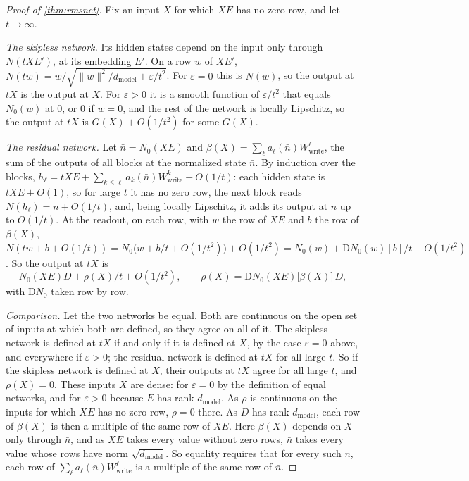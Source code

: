 \documentclass[10pt]{article}
\theoremstyle{definition}
\theoremstyle{remark}
\newcommand{\Wwrite}{W_{\mathrm{write}}}
\newcommand{\dm}{d_{\mathrm{model}}}
\newcommand{\Der}{\mathrm{D}}
\newcommand{\norm}[1]{\lVert #1\rVert}
\begin{document}
\begin{proof}[Proof of \cref{thm:rmsnet}]
Fix an input $X$ for which $XE$ has no zero row, and let $t \to \infty$.

\emph{The skipless network.} Its hidden states depend on the input only through $N(tXE')$, at its embedding $E'$. On a row $w$ of $XE'$, $N(tw) = w/\sqrt{\norm{w}^2/\dm + \varepsilon/t^2}$. For $\varepsilon = 0$ this is $N(w)$, so the output at $tX$ is the output at $X$. For $\varepsilon > 0$ it is a smooth function of $\varepsilon/t^2$ that equals $N_0(w)$ at $0$, or $0$ if $w = 0$, and the rest of the network is locally Lipschitz, so the output at $tX$ is $G(X) + O(1/t^2)$ for some $G(X)$.

\emph{The residual network.} Let $\bar n = N_0(XE)$ and $\beta(X) = \sum_\ell a_\ell(\bar n)\Wwrite^{\ell}$, the sum of the outputs of all blocks at the normalized state $\bar n$. By induction over the blocks, $h_\ell = tXE + \sum_{k \le \ell} a_k(\bar n)\Wwrite^{k} + O(1/t)$: each hidden state is $tXE + O(1)$, so for large $t$ it has no zero row, the next block reads $N(h_\ell) = \bar n + O(1/t)$, and, being locally Lipschitz, it adds its output at $\bar n$ up to $O(1/t)$. At the readout, on each row, with $w$ the row of $XE$ and $b$ the row of $\beta(X)$, $N(tw + b + O(1/t)) = N_0\big(w + b/t + O(1/t^2)\big) + O(1/t^2) = N_0(w) + \Der N_0(w)[b]/t + O(1/t^2)$. So the output at $tX$ is
\[
N_0(XE)D + \rho(X)/t + O(1/t^2), \qquad \rho(X) = \Der N_0(XE)\big[\beta(X)\big]\,D,
\]
with $\Der N_0$ taken row by row.

\emph{Comparison.} Let the two networks be equal. Both are continuous on the open set of inputs at which both are defined, so they agree on all of it. The skipless network is defined at $tX$ if and only if it is defined at $X$, by the case $\varepsilon = 0$ above, and everywhere if $\varepsilon > 0$; the residual network is defined at $tX$ for all large $t$. So if the skipless network is defined at $X$, their outputs at $tX$ agree for all large $t$, and $\rho(X) = 0$. These inputs $X$ are dense: for $\varepsilon = 0$ by the definition of equal networks, and for $\varepsilon > 0$ because $E$ has rank $\dm$. As $\rho$ is continuous on the inputs for which $XE$ has no zero row, $\rho = 0$ there. As $D$ has rank $\dm$, each row of $\beta(X)$ is then a multiple of the same row of $XE$. Here $\beta(X)$ depends on $X$ only through $\bar n$, and as $XE$ takes every value without zero rows, $\bar n$ takes every value whose rows have norm $\sqrt{\dm}$. So equality requires that for every such $\bar n$, each row of $\sum_\ell a_\ell(\bar n)\Wwrite^{\ell}$ is a multiple of the same row of $\bar n$.


\end{proof}
\end{document}
